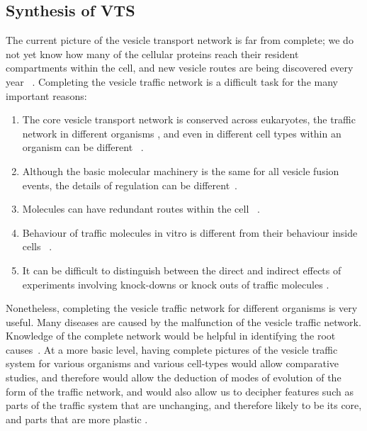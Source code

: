 \subsection{Synthesis of VTS }
The current picture of the vesicle transport network is far from complete; we do not yet know how many of the cellular proteins reach their resident compartments within the cell, and new vesicle routes are being discovered every year ~\cite{nickel2018unconventional,weill2018toolbox}. 
%
Completing the vesicle traffic network is a difficult task for the many important reasons: 
\begin{enumerate}
	\item The core vesicle transport network is conserved across eukaryotes, the traffic network in different organisms \cite{richardson2015evolutionary,nishimoto2009differential,barlow2017seeing}, and even in different cell types within an organism can be different ~\cite{stoops2014trafficking,zhou2015arp2}.
	
	\item Although the basic molecular machinery is the same for all vesicle fusion events, the details of regulation can be different~\cite{davletov2007regulation,di2010calcium}.
	
	\item Molecules can have redundant routes within the cell ~\cite{shimizu2014compensatory,nakatsukasa2014nutrient}.
	\item Behaviour of traffic molecules in vitro is different from their behaviour inside cells ~\cite{furukawa2014multiple}. 
	
	
	\item It can be difficult to distinguish between the direct and indirect effects of experiments involving knock-downs or knock outs of traffic molecules \cite{hirst2004epsinr,mishev2013small}.
\end{enumerate}

Nonetheless, completing the vesicle traffic network for different organisms is very useful. 
%
Many diseases are caused by the malfunction of the vesicle traffic network. 
%
Knowledge of the complete network would be helpful in identifying the root causes~\cite{bexiga2013human,gissen2007cargos}. 
%
At a more basic level, having complete pictures of the vesicle traffic system for various organisms and various cell-types would allow comparative studies, and therefore would allow the deduction of modes of evolution of the form of the traffic network, and would also allow us to decipher features such as parts of the traffic system that are unchanging, and therefore likely to be its core, and parts that are more plastic \cite{barlow2017seeing}.

